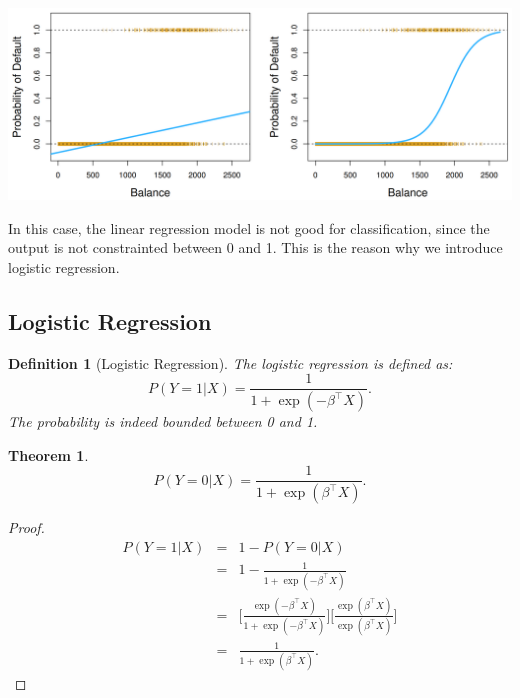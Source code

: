 \documentclass{article}
\theoremstyle{MyNonumberplain}
\theoremstyle{break}
\newtheorem*{proof}{Proof. }
\newcommand{\T}{^\intercal}
\theoremstyle{break}
\newtheorem{theorem}{Theorem}[section]
\theoremstyle{break}
\theoremstyle{break}
\newtheorem{definition}{Definition}[section]
\begin{document}
\begin{center}
    \includegraphics*[scale=0.2]{Images/img19.png}
\end{center}

In this case, the linear regression model is not good for classification, since the output is not constrainted between 0 and 1.
This is the reason why we introduce logistic regression.

\subsection{Logistic Regression}

\begin{defbox}
    \begin{definition}[Logistic Regression]
        The logistic regression is defined as: 
        $$
        P(Y=1|X)=\frac{1}{1+\exp(-\beta\T X)}.
        $$
        The probability is indeed bounded between 0 and 1.
    \end{definition}
\end{defbox}

\begin{thmbox}
    \begin{theorem}
        $$
        P(Y=0|X)=\frac{1}{1+\exp(\beta\T X)}.
        $$        
    \end{theorem}
    \begin{prfbox}
        \begin{proof}
            \begin{eqnarray*}
                P(Y=1|X) &=& 1 - P(Y=0|X)\\
                         &=& 1 - \frac{1}{1+\exp(-\beta\T X)}\\
                         &=& \Biggl[\frac{\exp(-\beta\T X)}{1+\exp(-\beta\T X)}\Biggr]\Biggl[\frac{\exp(\beta\T X)}{\exp(\beta\T X)}\Biggr]\\
                         &=& \frac{1}{1+\exp(\beta\T X)}.
            \end{eqnarray*}
        \end{proof}
    \end{prfbox}
\end{thmbox}
\end{document}
